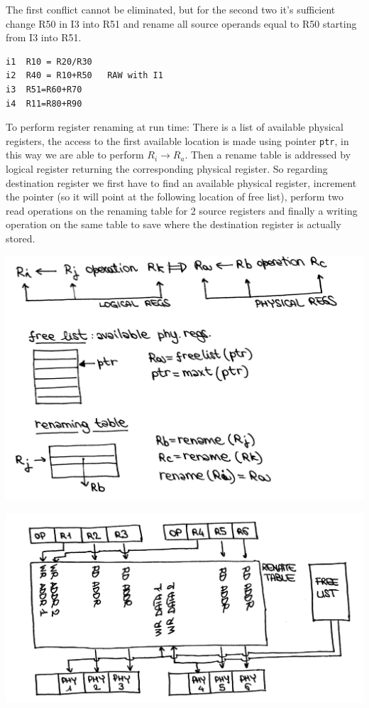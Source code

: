 The first conflict cannot be eliminated, but for the second two it's sufficient
change R50 in I3 into R51 and rename all source operands equal to R50 starting
from I3 into R51.
\begin{verbatim}
i1  R10 = R20/R30
i2  R40 = R10+R50   RAW with I1
i3  R51=R60+R70
i4  R11=R80+R90
\end{verbatim}

To perform register renaming at run time:
There is a list of available physical registers, the access to the first
available location is made using pointer \verb|ptr|, in this way we are able to
perform $R_i \rightarrow R_a$.
Then a rename table is addressed by logical register returning the
corresponding physical register. So regarding destination register we first
have to find an available physical register, increment the pointer (so it will
point at the following location of free list), perform two read operations on
the renaming table for 2 source registers and finally a writing operation on
the same table to save where the destination register is actually stored.
\begin{center}
  \includegraphics[width=1.0\linewidth]{img/img3/26a}
\end{center}
\begin{center}
  \includegraphics[width=1.0\linewidth]{img/img3/26}
\end{center}

